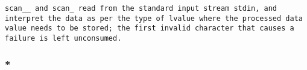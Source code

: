 \tt{scan__} and \tt{scan_} read from the standard input stream \tt{stdin},
and interpret the data as per the type of lvalue
where the processed data value needs to be stored;
the first invalid character that causes a failure is left unconsumed.

\subsubsection{}


\subsubsection{*}

